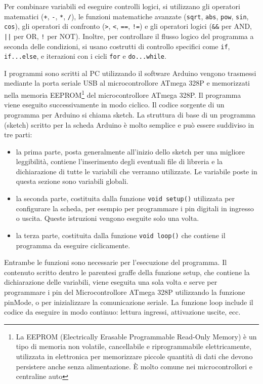 \documentclass[12pt, letterpaper]{book}
\begin{document}
    Per combinare variabili ed eseguire controlli logici, si utilizzano gli operatori matematici (\texttt{+}, \texttt{-}, \texttt{*}, \texttt{/}), le funzioni matematiche avanzate (\texttt{sqrt}, \texttt{abs}, \texttt{pow}, \texttt{sin}, \texttt{cos}), gli operatori di confronto (\texttt{>}, \texttt{<}, \texttt{==}, \texttt{!=}) e gli operatori logici (\texttt{\&\&} per AND, \texttt{||} per OR, \texttt{!} per NOT). 
    Inoltre, per controllare il flusso logico del programma a seconda delle condizioni, si usano costrutti di controllo specifici come \texttt{if}, \texttt{if...else}, e iterazioni con i cicli \texttt{for} e \texttt{do...while}.

    I programmi sono scritti al PC utilizzando il software Arduino vengono trasmessi mediante la porta seriale USB al microcontrollore ATmega 328P e memorizzati nella memoria EEPROM\footnote{La EEPROM (Electrically Erasable Programmable Read-Only Memory) è un tipo di memoria non volatile, cancellabile e riprogrammabile elettricamente, utilizzata in elettronica per memorizzare piccole quantità di dati che devono persistere anche senza alimentazione. È molto comune nei microcontrollori e centraline auto} del microcontrollore ATmega 328P. Il programma viene eseguito successivamente in modo ciclico. Il codice sorgente di un programma per Arduino si chiama sketch. La struttura di base di un programma (sketch) scritto per la scheda Arduino è molto semplice e può essere suddiviso in tre parti:

    \begin{itemize}[leftmargin=1.2cm, itemsep=1pt, topsep=5pt]
      \item la prima parte, posta generalmente all’inizio dello sketch per una migliore leggibilità, contiene l’inserimento degli eventuali file di libreria e la dichiarazione di tutte le variabili che verranno utilizzate. Le variabile poste in questa sezione sono variabili globali.
      \item  la seconda parte, costituita dalla funzione \lstinline[style=myArduino]{void setup()} utilizzata per configurare la scheda, per esempio per programmare i pin digitali in ingresso o uscita. Queste istruzioni vengono eseguite solo una volta.
      \item la terza parte, costituita dalla funzione \lstinline[style=myArduino]{void loop()} che contiene il programma da eseguire ciclicamente. 
    \end{itemize}

    Entrambe le funzioni sono necessarie per l’esecuzione del programma. Il contenuto scritto dentro le parentesi graffe della funzione setup, che contiene la dichiarazione delle variabili, viene eseguita una sola volta e serve per programmare i pin del Microcontrollore ATmega 328P utilizzando la funzione pinMode, o per inizializzare la comunicazione seriale. 
    La funzione loop include il codice da eseguire in modo continuo: lettura ingressi, attivazione uscite, ecc.
\end{document}
